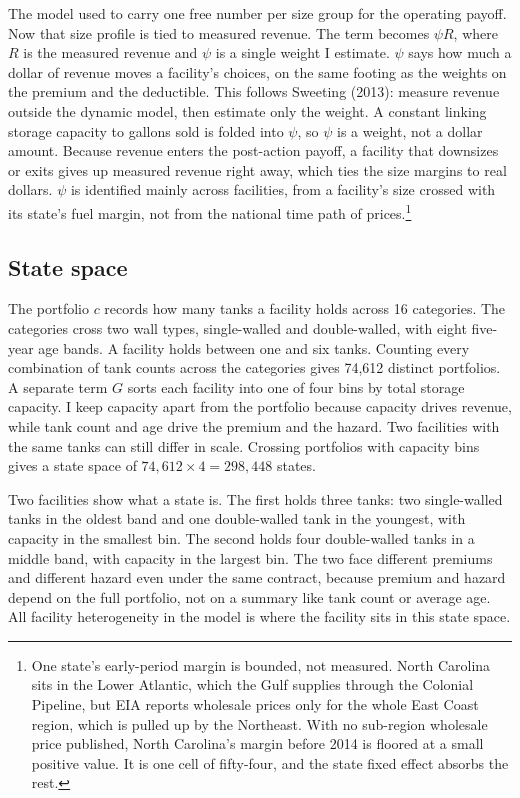 \documentclass[
  12pt,
]{article}
\begin{document}
The model used to carry one free number per size group for the operating
payoff. Now that size profile is tied to measured revenue. The term
becomes \(\psi R\), where \(R\) is the measured revenue and \(\psi\) is
a single weight I estimate. \(\psi\) says how much a dollar of revenue
moves a facility's choices, on the same footing as the weights on the
premium and the deductible. This follows Sweeting (2013): measure
revenue outside the dynamic model, then estimate only the weight. A
constant linking storage capacity to gallons sold is folded into
\(\psi\), so \(\psi\) is a weight, not a dollar amount. Because revenue
enters the post-action payoff, a facility that downsizes or exits gives
up measured revenue right away, which ties the size margins to real
dollars. \(\psi\) is identified mainly across facilities, from a
facility's size crossed with its state's fuel margin, not from the
national time path of prices.\footnote{One state's early-period margin
  is bounded, not measured. North Carolina sits in the Lower Atlantic,
  which the Gulf supplies through the Colonial Pipeline, but EIA reports
  wholesale prices only for the whole East Coast region, which is pulled
  up by the Northeast. With no sub-region wholesale price published,
  North Carolina's margin before 2014 is floored at a small positive
  value. It is one cell of fifty-four, and the state fixed effect
  absorbs the rest.}

\subsection{State space}\label{state-space}

The portfolio \(c\) records how many tanks a facility holds across 16
categories. The categories cross two wall types, single-walled and
double-walled, with eight five-year age bands. A facility holds between
one and six tanks. Counting every combination of tank counts across the
categories gives 74,612 distinct portfolios. A separate term \(G\) sorts
each facility into one of four bins by total storage capacity. I keep
capacity apart from the portfolio because capacity drives revenue, while
tank count and age drive the premium and the hazard. Two facilities with
the same tanks can still differ in scale. Crossing portfolios with
capacity bins gives a state space of \(74{,}612 \times 4 = 298{,}448\)
states.

Two facilities show what a state is. The first holds three tanks: two
single-walled tanks in the oldest band and one double-walled tank in the
youngest, with capacity in the smallest bin. The second holds four
double-walled tanks in a middle band, with capacity in the largest bin.
The two face different premiums and different hazard even under the same
contract, because premium and hazard depend on the full portfolio, not
on a summary like tank count or average age. All facility heterogeneity
in the model is where the facility sits in this state space.
\end{document}
